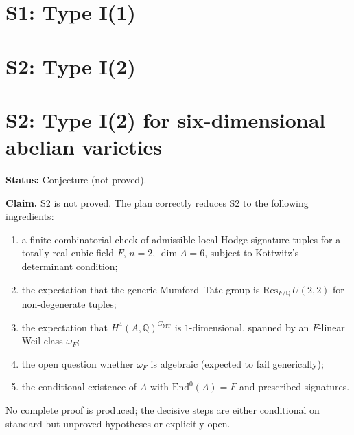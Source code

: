 \documentclass{article}
\begin{document}
\section{S1: Type I(1)}

\section{S2: Type I(2)}
\section*{S2: Type I(2) for six-dimensional abelian varieties}

\noindent\textbf{Status:} Conjecture (not proved).

\medskip

\noindent\textbf{Claim.} S2 is not proved. The plan correctly reduces S2 to the following
ingredients:
\begin{enumerate}
  \item[(i)] a finite combinatorial check of admissible local Hodge signature
    tuples for a totally real cubic field $F$, $n=2$, $\dim A=6$, subject to
    Kottwitz's determinant condition;
  \item[(ii)] the expectation that the generic Mumford--Tate group is
    $\mathrm{Res}_{F/\mathbb{Q}}\,U(2,2)$ for non-degenerate tuples;
  \item[(iii)] the expectation that $H^4(A,\mathbb{Q})^{G_{\mathrm{MT}}}$ is
    $1$-dimensional, spanned by an $F$-linear Weil class $\omega_F$;
  \item[(iv)] the open question whether $\omega_F$ is algebraic (expected to
    fail generically);
  \item[(v)] the conditional existence of $A$ with $\mathrm{End}^0(A)=F$ and
    prescribed signatures.
\end{enumerate}
No complete proof is produced; the decisive steps are either conditional on
standard but unproved hypotheses or explicitly open.
\end{document}
